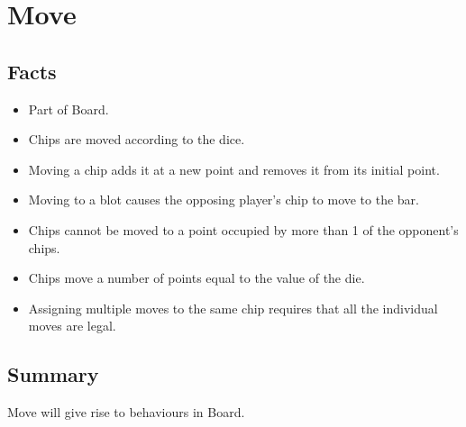 \section{Move}

\subsection{Facts}

\begin{itemize} [itemsep=2pt,parsep=2pt]
    \item Part of Board.
    \item Chips are moved according to the dice.
    \item Moving a chip adds it at a new point and removes it from its initial point.
    \item Moving to a blot causes the opposing player’s chip to move to the bar.
    \item Chips cannot be moved to a point occupied by more than 1 of the opponent's chips.
    \item Chips move a number of points equal to the value of the die.
    \item Assigning multiple moves to the same chip requires that all the individual moves are legal.
\end{itemize}


\subsection{Summary}
Move will give rise to behaviours in Board.
